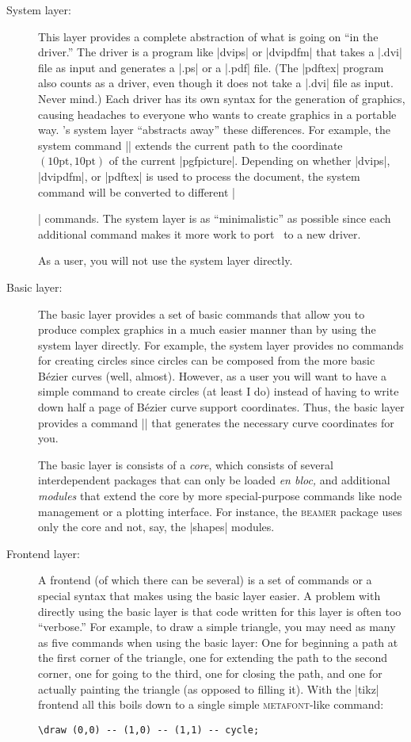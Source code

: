 \begin{description}
\item[System layer:] This layer provides a complete abstraction of what is
  going on ``in the driver.'' The driver is a program like |dvips| or
  |dvipdfm| that takes a |.dvi| file as input and generates a |.ps| or
  a |.pdf| file. (The |pdftex| program also counts as a driver, even
  though it does not take a |.dvi| file as input. Never mind.) Each
  driver has its own syntax for the generation of graphics, causing
  headaches to everyone who wants to create graphics in a portable
  way. \pgfname's system layer ``abstracts away'' these
  differences. For example, the system command
  |\pgfsys@lineto{10pt}{10pt}| extends the current path  to the coordinate
  $(10\mathrm{pt},10\mathrm{pt})$ of the current
  |{pgfpicture}|. Depending on whether |dvips|,
  |dvipdfm|, or |pdftex| is used to process the document, the system
  command will be converted to different |\special| commands.
  The system layer is as ``minimalistic'' as possible since each
  additional command makes it more work to port \pgfname\ to a new
  driver.

  As a user, you will not use the system layer directly.
\item[Basic layer:]
  The basic layer provides a set of basic commands that allow
  you to produce complex graphics in a much easier manner than by using
  the system layer directly. For example,  the system layer provides
  no commands for creating circles since circles can be composed from
  the more basic Bézier curves (well, almost). However, as a user you
  will want to have a simple command to create circles
  (at least I do) instead of having to write down half a page of
  Bézier  curve  support coordinates. Thus, the basic layer provides a
  command |\pgfpathcircle| that generates the necessary curve
  coordinates for you.

  The basic layer is consists of a \emph{core}, which consists of
  several interdependent packages that can only be loaded \emph{en
    bloc,} and additional \emph{modules} that extend the core by more
  special-purpose commands like node management or a plotting
  interface. For instance, the \textsc{beamer} package uses only the
  core and not, say, the |shapes| modules.
\item[Frontend layer:]
  A frontend (of which there can be several) is a set of commands
  or a special syntax that makes using the basic layer easier. A
  problem with directly using the basic layer is that code written for
  this layer is often too ``verbose.'' For example, to draw a simple
  triangle, you may need as many as five commands when using the basic
  layer: One for beginning a path at the first corner of the triangle,
  one for extending the path to the second corner, one for going to
  the third, one for closing the path, and one for actually painting
  the triangle (as opposed to filling it). With the |tikz| frontend
  all this boils down to a single simple \textsc{metafont}-like
  command:
\begin{verbatim}
\draw (0,0) -- (1,0) -- (1,1) -- cycle;
\end{verbatim}


\end{description}
